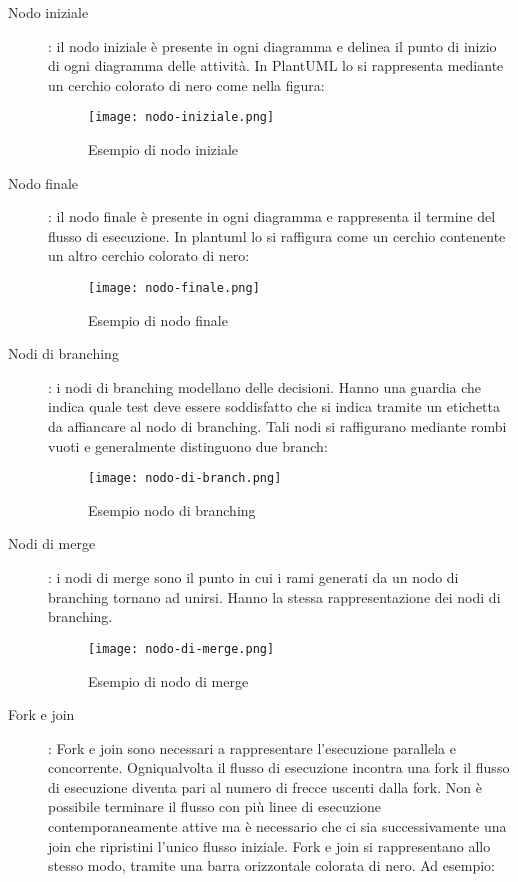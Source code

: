 \documentclass[../../norme-di-progetto.tex]{subfiles}
\begin{document}
  \begin{description}
    \item[Nodo iniziale]: il nodo iniziale è presente in ogni diagramma e delinea il punto di inizio di ogni diagramma delle attività. In PlantUML lo si rappresenta mediante un cerchio colorato di nero come nella figura:
    \begin{figure}[H]%
      \label{fig:nodo_iniziale}
      \texttt{[image: nodo-iniziale.png]}
      \centering
      \caption{Esempio di nodo iniziale}
    \end{figure}
    \item[Nodo finale]: il nodo finale è presente in ogni diagramma e rappresenta il termine del flusso di esecuzione. In plantuml lo si raffigura come un cerchio contenente un altro cerchio colorato di nero:
    \begin{figure}[H]%
      \label{fig:nodo_finale}
      \texttt{[image: nodo-finale.png]}
      \centering
      \caption{Esempio di nodo finale}
    \end{figure}
    \item[Nodi di branching]: i nodi di branching modellano delle decisioni. Hanno una guardia che indica quale test deve essere soddisfatto che si indica tramite un etichetta da affiancare al nodo di branching. Tali nodi si raffigurano mediante rombi vuoti e generalmente distinguono due branch:
    \begin{figure}[H]%
      \label{fig:nodo_di_branch}
      \texttt{[image: nodo-di-branch.png]}
      \centering
      \caption{Esempio nodo di branching}
    \end{figure}
     \item[Nodi di merge]: i nodi di merge sono il punto in cui i rami generati da un nodo di branching tornano ad unirsi. Hanno la stessa rappresentazione dei nodi di branching.
    \begin{figure}[H]%
      \label{fig:nodo_di_merge}
      \texttt{[image: nodo-di-merge.png]}
      \centering
      \caption{Esempio di nodo di merge}
    \end{figure}
     \item[Fork e join]: Fork e join sono necessari a rappresentare l'esecuzione parallela e concorrente. Ogniqualvolta il flusso di esecuzione incontra una fork il flusso di esecuzione diventa pari al numero di frecce uscenti dalla fork. Non è possibile terminare il flusso con più linee di esecuzione contemporaneamente attive ma è necessario che ci sia successivamente una join che ripristini l'unico flusso iniziale. Fork e join si rappresentano allo stesso modo, tramite una barra orizzontale colorata di nero. Ad esempio:

\end{description}
\end{document}
